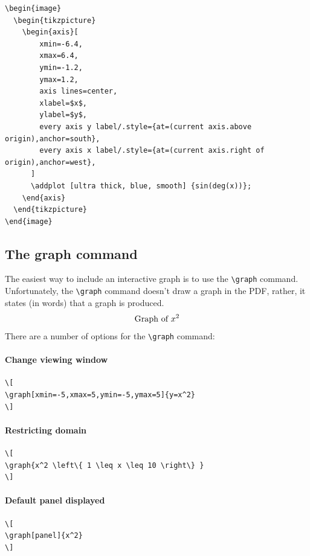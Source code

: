\documentclass{ximera}
\begin{document}
\begin{verbatim}
\begin{image}
  \begin{tikzpicture}
    \begin{axis}[
        xmin=-6.4,
        xmax=6.4,
        ymin=-1.2,
        ymax=1.2,
        axis lines=center,
        xlabel=$x$,
        ylabel=$y$,
        every axis y label/.style={at=(current axis.above origin),anchor=south},
        every axis x label/.style={at=(current axis.right of origin),anchor=west},
      ]
      \addplot [ultra thick, blue, smooth] {sin(deg(x))};
    \end{axis}
  \end{tikzpicture}
\end{image}
\end{verbatim}






\subsection{The graph command}

The easiest way to include an interactive graph is to use the
\verb|\graph| command. Unfortunately, the \verb|\graph| command
doesn't draw a graph in the PDF, rather, it states (in words) that a
graph is produced.
\[
\text{Graph of $x^2$}
\]
There are a number of options for the \verb|\graph| command:


\paragraph{Change viewing window}

  
\begin{verbatim}
\[
\graph[xmin=-5,xmax=5,ymin=-5,ymax=5]{y=x^2}
\]
\end{verbatim}
\paragraph{Restricting domain}


\begin{verbatim}
\[
\graph{x^2 \left\{ 1 \leq x \leq 10 \right\} }
\]
\end{verbatim}
\paragraph{Default panel displayed}

  
\begin{verbatim}
\[
\graph[panel]{x^2}
\]
\end{verbatim}
\end{document}
